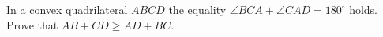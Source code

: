 \problem
In a convex quadrilateral $ABCD$ the equality
$\angle BCA + \angle CAD = 180^\circ$ holds.
Prove that $AB + CD \geq AD + BC$.
\solution
\endproblem
